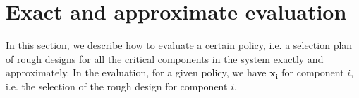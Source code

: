 \documentclass[preprint,12pt]{elsarticle}
\begin{document}
\section{Exact and approximate evaluation}
In this section, we describe how to evaluate a certain policy, i.e. a selection plan of rough designs for all the critical components in the system exactly and approximately. In the evaluation, for a given policy, we have $\boldsymbol{x_{i}}$ for component $i$, i.e. the selection of the rough design for component $i$.
\end{document}
